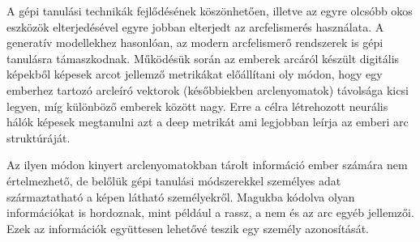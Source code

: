 


A gépi tanulási technikák fejlődésének köszönhetően, illetve az egyre olcsóbb okos eszközök elterjedésével egyre jobban elterjedt az arcfelismerés használata. A generatív modellekhez hasonlóan, az modern arcfelismerő rendszerek is gépi tanulásra támaszkodnak. Működésük során az emberek arcáról készült digitális képekből képesek arcot jellemző metrikákat előállítani oly módon, hogy egy emberhez tartozó arcleíró vektorok (későbbiekben arclenyomatok) távolsága kicsi legyen, míg különböző emberek között nagy. Erre a célra létrehozott neurális hálók képesek megtanulni azt a deep metrikát ami legjobban leírja az emberi arc struktúráját.


Az ilyen módon kinyert arclenyomatokban tárolt információ ember számára nem értelmezhető, de belőlük gépi tanulási módszerekkel személyes adat származtatható a képen látható személyekről. Magukba kódolva olyan információkat is hordoznak, mint például a rassz, a nem és az arc egyéb jellemzői. Ezek az információk együttesen lehetővé teszik egy személy azonosítását.



